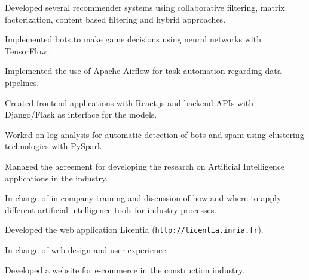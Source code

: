\documentclass[]{deedy-resume-openfont}
\begin{document}
\begin{tightemize}
\item Developed several recommender systems using collaborative filtering, matrix
factorization, content based filtering and hybrid approaches.
\item Implemented bots to make game decisions using neural networks with 
TensorFlow.
\item Implemented the use of Apache Airflow for task automation regarding data pipelines.
\item Created frontend applications with React.js and
backend APIs with Django/Flask as interface for the models.
\item Worked on log analysis for automatic detection of bots and spam using
clustering technologies with PySpark.
\end{tightemize}
\sectionsep

\begin{tightemize}
\item Managed the agreement for developing the research on Artificial Intelligence applications in the industry.
\item In charge of in-company training and discussion of how and where to apply different artificial 
      intelligence tools for industry processes.
\end{tightemize}
\sectionsep

\begin{tightemize}
\item Developed the web application Licentia (\texttt{http://licentia.inria.fr}).
\item In charge of web design and user experience.
\end{tightemize}
\sectionsep

\begin{tightemize}
\item Developed a website for e-commerce in the construction industry.
\end{tightemize}
\sectionsep

\end{document}
